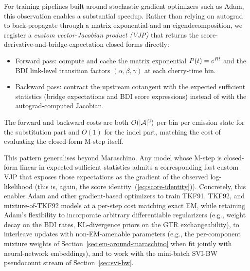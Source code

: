 For training pipelines built around stochastic-gradient optimizers
such as Adam, this observation enables a substantial speedup.
Rather than relying on autograd to back-propagate through a matrix
exponential and an eigendecomposition, we register a
\emph{custom vector-Jacobian product (VJP)} that returns the
score-derivative-and-bridge-expectation closed forms directly:
\begin{itemize}[nosep]
\item Forward pass: compute and cache the matrix exponential
$P(t) = e^{R t}$ and the BDI link-level transition factors
$(\alpha,\beta,\gamma)$ at each cherry-time bin.
\item Backward pass: contract the upstream cotangent with the
expected sufficient statistics (bridge expectations and BDI score
expressions) instead of with the autograd-computed Jacobian.
\end{itemize}
The forward and backward costs are both
$O(|\mathcal{A}|^2)$ per bin per emission state for the substitution
part and $O(1)$ for the indel part, matching the cost of evaluating
the closed-form M-step itself.

This pattern generalises beyond Maraschino.  Any model whose
M-step is closed-form linear in expected sufficient statistics admits
a corresponding fast custom VJP that exposes those expectations as the
gradient of the observed log-likelihood (this is, again, the score
identity~(\ref{eq:score-identity})).  Concretely, this enables Adam
and other gradient-based optimizers to train TKF91, TKF92, and
mixture-of-TKF92 models at a per-step cost matching exact EM, while
retaining Adam's flexibility to incorporate arbitrary differentiable
regularizers (e.g., weight decay on the BDI rates, KL-divergence
priors on the GTR exchangeability), to interleave updates with
non-EM-amenable parameters (e.g., the per-component mixture
weights of Section~\ref{sec:em-around-maraschino} when fit
jointly with neural-network embeddings), and to work
with the mini-batch SVI-BW pseudocount stream of
Section~\ref{sec:svi-bw}.
